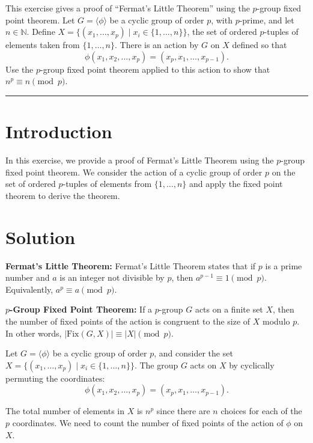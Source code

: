 \documentclass[12pt]{amsart}
\theoremstyle{definition}
\numberwithin{equation}{section}
\begin{document}
\begin{exercise}{5} This exercise gives a proof of ``Fermat's Little Theorem'' using the \(p\)-group fixed point theorem. Let \(G = \langle \phi \rangle \) be a cyclic group of order \(p\), with \(p\)-prime, and let \(n \in \mathbb{N}\). Define \(X = \{(x_1, \dots, x_p) \mid x_i \in \{1, \dots, n\} \} \), the set of ordered \(p\)-tuples of elements taken from \( \{1, \dots, n\} \). There is an action by \(G\) on \(X\) defined so that \[\phi(x_1, x_2, \dots, x_p) = (x_p, x_1, \dots, x_{p-1}).\] Use the \(p\)-group fixed point theorem applied to this action to show that \(n^p \equiv n \pmod{p}\).

    \noindent\rule{\linewidth}{1pt}

    \section*{Introduction}
    
    In this exercise, we provide a proof of Fermat's Little Theorem using the \(p\)-group fixed point theorem. We consider the action of a cyclic group of order \(p\) on the set of ordered \(p\)-tuples of elements from \( \{1, \dots, n\} \) and apply the fixed point theorem to derive the theorem.

    \section*{Solution}
    
    \noindent \textbf{Fermat's Little Theorem:} Fermat's Little Theorem states that if \(p\) is a prime number and \(a\) is an integer not divisible by \(p\), then \(a^{p-1} \equiv 1 \pmod{p}\). Equivalently, \(a^p \equiv a \pmod{p}\).

    \noindent \textbf{\(p\)-Group Fixed Point Theorem:} If a \(p\)-group \(G\) acts on a finite set \(X\), then the number of fixed points of the action is congruent to the size of \(X\) modulo \(p\). In other words, \(|\text{Fix}(G, X)| \equiv |X| \pmod{p}\).

    Let \(G = \langle \phi \rangle \) be a cyclic group of order \(p\), and consider the set \(X = \{(x_1, \dots, x_p) \mid x_i \in \{1, \dots, n\} \} \). The group \(G\) acts on \(X\) by cyclically permuting the coordinates:
    \[
    \phi(x_1, x_2, \dots, x_p) = (x_p, x_1, \dots, x_{p-1}).
    \]

    The total number of elements in \(X\) is \(n^p\) since there are \(n\) choices for each of the \(p\) coordinates. We need to count the number of fixed points of the action of \(\phi \) on \(X\).


\end{exercise}
\end{document}
